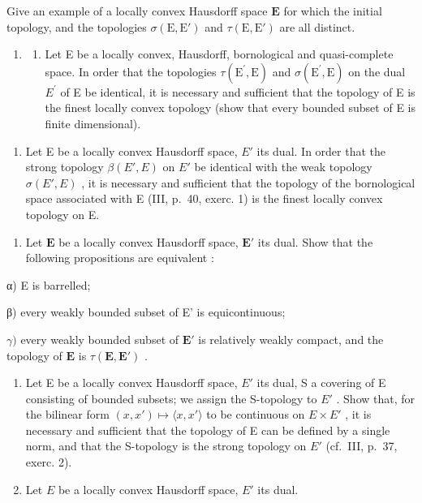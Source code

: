 Give an example of a locally convex Hausdorff space \(\mathbf{E}\) for which the initial topology, and the topologies \(\sigma(\mathrm{E},\mathrm{E}')\) and \(\tau(\mathrm{E},\mathrm{E}')\) are all distinct.

\begin{enumerate}
\def\labelenumi{\arabic{enumi})}
\setcounter{enumi}{8}
\tightlist
\item
  \begin{enumerate}
  \def\labelenumii{\alph{enumii})}
  \tightlist
  \item
    Let E be a locally convex, Hausdorff, bornological and quasi-complete space. In order that the topologies \(\tau(\mathrm{E}^{\prime},\mathrm{E})\) and \(\sigma(\mathrm{E}^{\prime},\mathrm{E})\) on the dual \(E^{\prime}\) of E be identical, it is necessary and sufficient that the topology of E is the finest locally convex topology (show that every bounded subset of E is finite dimensional).
  \end{enumerate}
\end{enumerate}

\begin{enumerate}
\def\labelenumi{\alph{enumi})}
\setcounter{enumi}{1}
\tightlist
\item
  Let E be a locally convex Hausdorff space, \(E'\) its dual. In order that the strong topology \(\beta(E', E)\) on \(E'\) be identical with the weak topology \(\sigma(E', E)\) , it is necessary and sufficient that the topology of the bornological space associated with E (III, p.~40, exerc. 1) is the finest locally convex topology on E.
\end{enumerate}

\begin{enumerate}
\def\labelenumi{\arabic{enumi})}
\setcounter{enumi}{9}
\tightlist
\item
  Let \(\mathbf{E}\) be a locally convex Hausdorff space, \(\mathbf{E}'\) its dual. Show that the following propositions are equivalent :
\end{enumerate}

α) E is barrelled;

β) every weakly bounded subset of E' is equicontinuous;

\(\gamma)\) every weakly bounded subset of \(\mathbf{E}'\) is relatively weakly compact, and the topology of \(\mathbf{E}\) is \(\tau (\mathbf{E},\mathbf{E}')\) .

\begin{enumerate}
\def\labelenumi{\arabic{enumi})}
\setcounter{enumi}{10}
\item
  Let E be a locally convex Hausdorff space, \(E'\) its dual, S a covering of E consisting of bounded subsets; we assign the S-topology to \(E'\) . Show that, for the bilinear form \((x, x') \mapsto \langle x, x' \rangle\) to be continuous on \(E \times E'\) , it is necessary and sufficient that the topology of E can be defined by a single norm, and that the S-topology is the strong topology on \(E'\) (cf.~III, p.~37, exerc. 2).
\item
  Let \(E\) be a locally convex Hausdorff space, \(E'\) its dual.
\end{enumerate}

